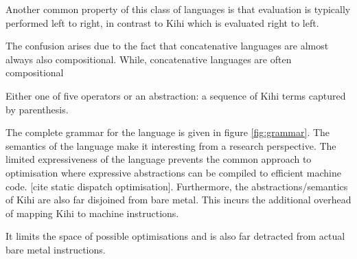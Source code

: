 Another common property of this class of languages is that evaluation
is typically performed left to right, in contrast to Kihi which is
evaluated right to left.

The confusion arises due to the fact that concatenative languages are
almost always also compositional.
While, concatenative languages are often compositional 



Either
one of five operators or an abstraction: a sequence of Kihi terms
captured by parenthesis. 

The complete grammar for the language is given
in figure \ref{fig:grammar}. The semantics of the language make it
interesting from a research perspective. The limited expressiveness of
the language prevents the common approach to optimisation where expressive
abstractions can be compiled to efficient machine code. [cite static
dispatch optimisation]. Furthermore, the abstractions/semantics of Kihi are
also far disjoined from bare metal. This incurs the additional overhead of
mapping Kihi to machine instructions.

It limits the space of possible
optimisations and is also far detracted from actual bare metal instructions.

